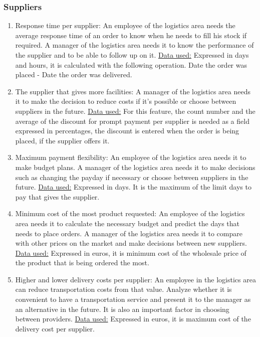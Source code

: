 \documentclass{article}
\begin{document}
\subsubsection{Suppliers}
\begin{enumerate}
  \item Response time per supplier: An employee of the logistics area needs the average response time of an order to know when he needs to fill his stock if required. A manager of the logistics area needs it to know the performance of the supplier and to be able to follow up on it. \underline{Data used:} Expressed in days and hours, it is calculated with the following operation. Date the order was placed - Date the order was delivered.
  \item The supplier that gives more facilities: A manager of the logistics area needs it to make the decision to reduce costs if it’s possible or choose between suppliers in the future. \underline{Data used:} For this feature, the count number and the average of the discount for prompt payment per supplier is needed as a field expressed in percentages, the discount is entered when the order is being placed, if the supplier offers it.
  \item Maximum payment flexibility: An employee of the logistics area needs it to make budget plans. A manager of the logistics area needs it to make decisions such as changing the payday if necessary or choose between suppliers in the future. \underline{Data used:} Expressed in days. It is the maximum of the limit days to pay that gives the supplier.
  \item Minimum cost of the most product requested: An employee of the logistics area needs it to calculate the necessary budget and predict the days that needs to place orders. A manager of the logistics area needs it to compare with other prices on the market and make decisions between new suppliers. \underline{Data used:} Expressed in euros, it is minimum cost of the wholesale price of the product that is being ordered the most.
  \item Higher and lower delivery costs per supplier: An employee in the logistics area can reduce transportation costs from that value. Analyze whether it is convenient to have a transportation service and present it to the manager as an alternative in the future. It is also an important factor in choosing between providers. \underline{Data used:} Expressed in euros, it is maximum cost of the delivery cost per supplier.
\end{enumerate}
\end{document}
